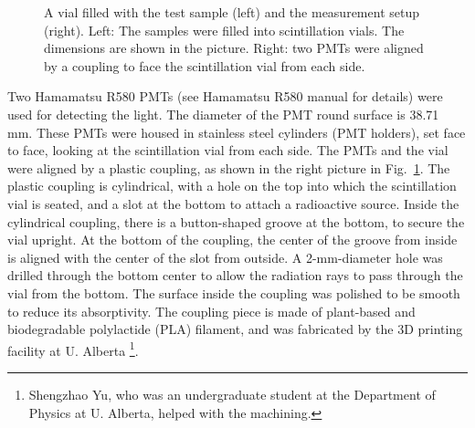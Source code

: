 \begin{figure}[htbp]
	\caption[A vial filled with the test sample and the measurement setup.]{A vial filled with the test sample (left) and the measurement setup (right). Left: The samples were filled into scintillation vials. The dimensions are shown in the picture. Right: two PMTs were aligned by a coupling to face the scintillation vial from each side.\label{scintVial}}
\end{figure}

Two Hamamatsu R580 PMTs (see Hamamatsu R580 manual \cite{pmtR580} for details) were used for detecting the light. The diameter of the PMT round surface is 38.71 mm. These PMTs were housed in stainless steel cylinders (PMT holders), set face to face, looking at the scintillation vial from each side. The PMTs and the vial were aligned by a plastic coupling, as shown in the right picture in Fig.~\ref{scintVial}. The plastic coupling is cylindrical, with a hole on the top into which the scintillation vial is seated, and a slot at the bottom to attach a radioactive source. Inside the cylindrical coupling, there is a button-shaped groove at the bottom, to secure the vial upright. At the bottom of the coupling, the center of the groove from inside is aligned with the center of the slot from outside. A 2-mm-diameter hole was drilled through the bottom center to allow the radiation rays to pass through the vial from the bottom. The surface inside the coupling was polished to be smooth to reduce its absorptivity. The coupling piece is made of plant-based and biodegradable polylactide (PLA) filament, and was fabricated by the 3D printing facility at U. Alberta \footnote{Shengzhao Yu, who was an undergraduate student at the Department of Physics at U. Alberta, helped with the machining.}.

